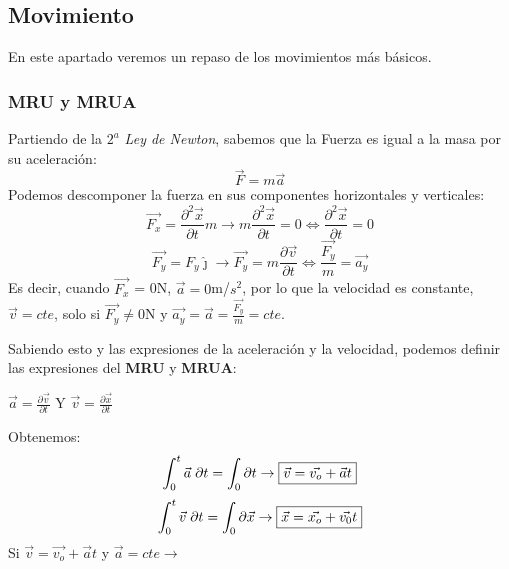\setlength{\parindent}{0ex}
\subsection{Movimiento}
En este apartado veremos un repaso de los movimientos más básicos.


\subsubsection{MRU y MRUA}

Partiendo de la \textit{\(2^a\) Ley de Newton}, sabemos que la Fuerza es igual a la masa por su aceleración:
\[\vec{F} = m\vec{a}\]
Podemos descomponer la fuerza en sus componentes horizontales y verticales:
\[
        \vec{F_{x}}=\frac{\partial^{2}\vec{x}}{\partial{t}}m
        \to
        m\frac{\partial^2 \vec{x}}{\partial t} = 0
        \Leftrightarrow
        \frac{\partial^2{\vec{x}}}{\partial{t}} = 0
\]
\[
        \vec{F_{y}}=F_{y}\hat{\jmath}
        \to
        \vec{F_y} = m\frac{\partial\vec{v}}{\partial t}\Leftrightarrow
        \frac{\vec{F_y}}{m} = \vec{a_y}
\]
Es decir, cuando \(\vec{F_x}\) = 0N, \(\vec{a}=0\)m/\(s^2\), por lo que la velocidad es constante, \(\vec{v}=cte\), solo si \(\vec{F_y}\neq 0\)N y \(\vec{a_y} = \vec{a} = \frac{\vec{F_y}}{m}=cte\).\par \vspace{0.5cm} Sabiendo esto y las expresiones de la aceleración y la velocidad, podemos definir las expresiones del \textbf{MRU} y \textbf{MRUA}: \par \vspace{0.5cm} \hspace{5cm}
\( \vec{a} = \frac{\partial \vec{v} }{\partial t}\) Y \( \vec{v} = \frac{\partial \vec{x} }{\partial t}\) \par \vspace{0.5cm} Obtenemos:
\[
        \int_{0}^{t}{\vec{a}\hspace{1mm}\partial{t}} = \int_{0}\partial{t}
        \to
        \boxed{\vec{v} = \vec{v_o} + \vec{a}t}
\]
\[
        \int_{0}^{t}{\vec{v}\hspace{1mm}\partial{t}} = \int_{0}{\partial{\vec{x}}}
        \to
        \boxed{\vec{x} = \vec{x_o} + \vec{v_0}t}
\]
\hspace{2.3cm} Si \( \vec{v} = \vec{v_o} + \vec{a}t\)
y
\( \vec{a} = cte \to\) 
